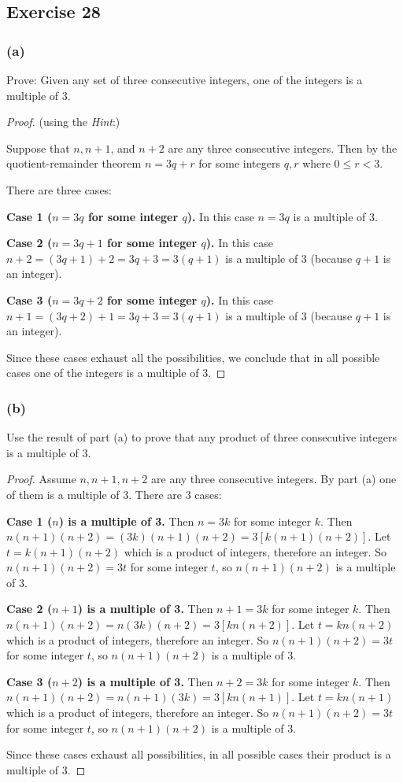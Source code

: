 \documentclass[14pt]{extarticle}
\begin{document}
\subsection{Exercise 28}

\subsubsection{(a)}
Prove: Given any set of three consecutive integers, one of the integers is a multiple of 3. 

\begin{proof}
(using the {\it Hint}:)

Suppose that $n, n + 1$, and $n + 2$ are any three consecutive integers. Then by the quotient-remainder theorem $n = 3q+r$ for some integers $q,r$ where $0 \leq r < 3$.

There are three cases:

{\bf Case 1 ($n = 3q$ for some integer $q$).} In this case $n = 3q$ is a multiple of 3.

{\bf Case 2 ($n = 3q + 1$ for some integer $q$).} In this case $n + 2 = (3q+1)+2 = 3q+3 = 3(q+1)$ is a multiple of 3 (because $q+1$ is an integer).

{\bf Case 3 ($n = 3q + 2$ for some integer $q$).} In this case $n + 1 = (3q + 2) + 1 = 3q+3 = 3(q+1)$ is a multiple of 3 (because $q+1$ is an integer).

Since these cases exhaust all the possibilities, we conclude that in all possible cases one of the integers is a multiple of 3.
\end{proof}

\subsubsection{(b)}
Use the result of part (a) to prove that any product of three consecutive integers is a multiple of 3.

\begin{proof}
Assume $n, n+1, n+2$ are any three consecutive integers. By part (a) one of them is a multiple of 3. There are 3 cases:

{\bf Case 1 ($n$) is a multiple of 3.} Then $n = 3k$ for some integer $k$. Then $n(n+1)(n+2) = (3k)(n+1)(n+2) = 3[k(n+1)(n+2)]$. Let $t = k(n+1)(n+2)$ which is a product of integers, therefore an integer. So $n(n+1)(n+2) = 3t$ for some integer $t$, so $n(n+1)(n+2)$ is a multiple of 3.

{\bf Case 2 ($n+1$) is a multiple of 3.} Then $n+1 = 3k$ for some integer $k$. Then $n(n+1)(n+2) = n(3k)(n+2) = 3[kn(n+2)]$. Let $t = kn(n+2)$ which is a product of integers, therefore an integer. So $n(n+1)(n+2) = 3t$ for some integer $t$, so $n(n+1)(n+2)$ is a multiple of 3.

{\bf Case 3 ($n+2$) is a multiple of 3.} Then $n+2 = 3k$ for some integer $k$. Then $n(n+1)(n+2) = n(n+1)(3k) = 3[kn(n+1)]$. Let $t = kn(n+1)$ which is a product of integers, therefore an integer. So $n(n+1)(n+2) = 3t$ for some integer $t$, so $n(n+1)(n+2)$ is a multiple of 3.

Since these cases exhaust all possibilities, in all possible cases their product is a multiple of 3.
\end{proof}
\end{document}
